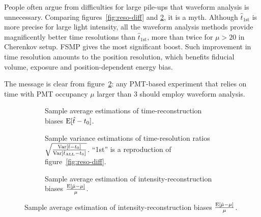 People often argue from difficulties for large pile-ups that waveform analysis is unnecessary.  Comparing figures~\ref{fig:reso-diff} and \ref{fig:deltamethods}, it is a myth.  Although $\hat{t}_\mathrm{1st}$ is more precise for large light intensity, all the waveform analysis methods provide magnificently better time resolutions than $\hat{t}_\mathrm{1st}$, more than twice for $\mu>20$ in Cherenkov setup.  FSMP gives the most significant boost.  Such improvement in time resolution amounts to the position resolution, which benefits fiducial volume, exposure and position-dependent energy bias.

The message is clear from figure~\ref{fig:deltamethods}: any PMT-based experiment that relies on time with PMT occupancy $\mu$ larger than 3 should employ waveform analysis.

\begin{figure}[H]
  \begin{subfigure}[b]{\textwidth}
    \centering
    \resizebox{0.99\textwidth}{!}{}
    \vspace{-0.5em}
    \caption{\label{fig:biasmethods} Sample average estimations of time-reconstruction biases $\operatorname{E}[\hat{t} - t_0]$.}
  \end{subfigure}

  \vspace{0.5em}
  \begin{subfigure}[b]{\textwidth}
    \centering
    \resizebox{0.99\textwidth}{!}{}
    \vspace{-0.5em}
    \caption{\label{fig:deltamethods} Sample variance estimations of time-resolution ratios $\sqrt{\frac{\operatorname{Var}[\hat{t} - t_0]}{\operatorname{Var}[\hat{t}_\mathrm{ALL} - t_0]}}$. ``1st'' is a reproduction of figure~\ref{fig:reso-diff}.}
  \end{subfigure}

  \vspace{0.5em}
  \begin{subfigure}[b]{\textwidth}
    \centering
    \resizebox{0.99\textwidth}{!}{}
    \vspace{-0.5em}
    \caption{\label{fig:biasmu} Sample average estimation of intensity-reconstruction biases $\frac{\operatorname{E}[\hat{\mu} - \mu]}{\mu}$.}
  \end{subfigure}


\end{figure}
